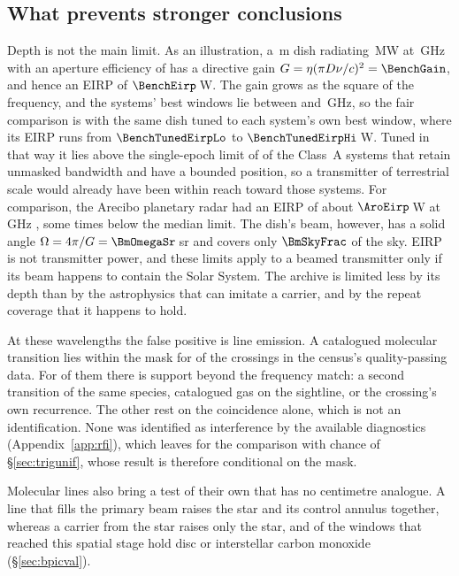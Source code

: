 \subsection{What prevents stronger conclusions}
\label{sec:mmdifferent}

Depth is not the main limit. As an illustration, a \BenchDiam\,m dish
radiating \BenchPowerMW\,MW at \BenchFreqGHz\,GHz with an aperture efficiency
of \BenchEta{} has a directive gain $G=\eta(\pi D\nu/c)^{2}=\BenchGain$, and
hence an EIRP of $\BenchEirp$\,W. The gain grows as the square of the
frequency, and the systems' best windows lie between \BenchTunedFreqLo{} and
\BenchTunedFreqHi\,GHz, so the fair comparison is with the same dish tuned to
each system's own best window, where its EIRP runs from
$\BenchTunedEirpLo$ to $\BenchTunedEirpHi$\,W. Tuned in that way it lies
above the single-epoch limit of \BenchNSysTuned{} of the \NSysALimSum{}
Class~A systems that retain unmasked bandwidth and have a bounded position,
so a transmitter of terrestrial scale would already have been within reach
toward those systems. For comparison, the Arecibo planetary radar had an EIRP
of about $\AroEirp$\,W at \AroFreqGHz\,GHz \citep{EarthDetectingEarth2025},
some \AroMedMult{} times below the median limit. The dish's beam, however, has a solid
angle $\Omega=4\pi/G=\BmOmegaSr$\,sr and covers only $\BmSkyFrac$ of the sky.
EIRP is not transmitter power, and these limits apply to a beamed
transmitter only if its beam happens to contain the Solar System. The
archive is limited less by its depth than by the astrophysics that can
imitate a carrier, and by the repeat coverage that it happens to hold.

At these wavelengths the false positive is line emission. A
catalogued molecular transition lies within the mask for \CsNAttrQp{} of the
\CsNCrossQp{} crossings in the census's quality-passing data. For
\LnAttrSupp{} of them there is support beyond the frequency match: a second
transition of the same species, catalogued gas on the sightline, or the
crossing's own recurrence. The other \LnAttrCoincWord{} rest on the
coincidence alone, which is not an identification. None was identified as
interference by the available diagnostics (Appendix~\ref{app:rfi}), which
leaves \CsNUnattrQp{} for the comparison with chance of \S\ref{sec:trigunif},
whose result is therefore conditional on the mask.

Molecular lines also bring a test of their own that has no centimetre
analogue. A line that fills the primary beam raises the star and its control
annulus together, whereas a carrier from the star raises only the star, and
\DiscFpWin{} of the \DiscFpOfFlags{} windows that reached this spatial stage
hold disc or interstellar carbon monoxide (\S\ref{sec:bpicval}).

